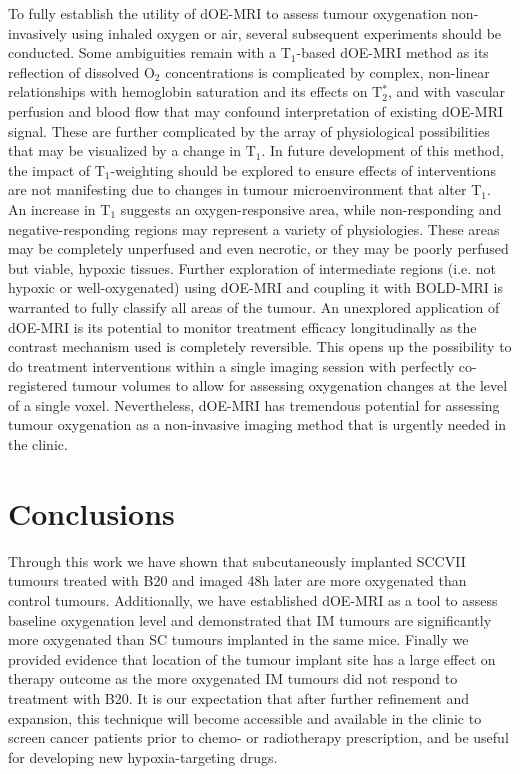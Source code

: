 To fully establish the utility of \acs{dOE-MRI} to assess tumour oxygenation non-invasively using inhaled oxygen or air, several subsequent experiments should be conducted.
Some ambiguities remain with a T$_1$-based \acs{dOE-MRI} method as its reflection of dissolved O$_2$ concentrations is complicated by complex, non-linear relationships with hemoglobin saturation and its effects on T$_2^*$, and with vascular perfusion and blood flow that may confound interpretation of existing \acs{dOE-MRI} signal.
These are further complicated by the array of physiological possibilities that may be visualized by a change in T$_1$. 
In future development of this method, the impact of T$_1$-weighting should be explored to ensure effects of interventions are not manifesting due to changes in tumour microenvironment that alter T$_1$.
An increase in T$_1$ suggests an oxygen-responsive area, while non-responding and negative-responding regions may represent a variety of physiologies. 
These areas may be completely unperfused and even necrotic, or they may be poorly perfused but viable, hypoxic tissues.
Further exploration of intermediate regions (i.e. not hypoxic or well-oxygenated) using \acs{dOE-MRI} and coupling it with \acs{BOLD}-MRI is warranted to fully classify all areas of the tumour. 
An unexplored application of \acs{dOE-MRI} is its potential to monitor treatment efficacy longitudinally as the contrast mechanism used is completely reversible. 
This opens up the possibility to do treatment interventions within a single imaging session with perfectly co-registered tumour volumes to allow for assessing oxygenation changes at the level of a single voxel.
Nevertheless, \acs{dOE-MRI} has tremendous potential for assessing tumour oxygenation as a non-invasive imaging method that is urgently needed in the clinic. 

\section{Conclusions}

Through this work we have shown that subcutaneously implanted SCCVII tumours treated with B20 and imaged 48h later are more oxygenated than control tumours. 
Additionally, we have established \acs{dOE-MRI} as a tool to assess baseline oxygenation level and demonstrated that \acs{IM} tumours are significantly more oxygenated than \acs{SC} tumours implanted in the same mice.
Finally we provided evidence that location of the tumour implant site has a large effect on therapy outcome as the more oxygenated \acs{IM} tumours did not respond to treatment with B20.
It is our expectation that after further refinement and expansion, this technique will become accessible and available in the clinic to screen cancer patients prior to chemo- or radiotherapy prescription, and be useful for developing new hypoxia-targeting drugs.




